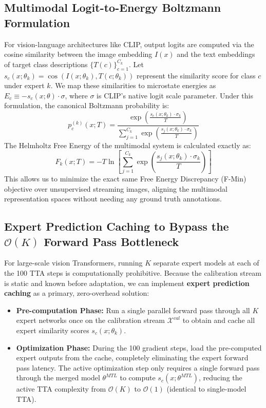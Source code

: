 \documentclass{article}
\theoremstyle{plain}
\theoremstyle{definition}
\theoremstyle{remark}
\begin{document}
\subsection{Multimodal Logit-to-Energy Boltzmann Formulation}
For vision-language architectures like CLIP, output logits are computed via the cosine similarity between the image embedding $I(x)$ and the text embeddings of target class descriptions $\{T(c)\}_{c=1}^{C_k}$. Let $s_c(x; \theta_k) = \cos\left( I(x; \theta_k), T(c; \theta_k) \right)$ represent the similarity score for class $c$ under expert $k$. We map these similarities to microstate energies as $E_c \equiv - s_c(x; \theta) \cdot \sigma$, where $\sigma$ is CLIP's native logit scale parameter. Under this formulation, the canonical Boltzmann probability is:
\begin{equation}
p_c^{(k)}(x; T) = \frac{\exp\left( \frac{s_c(x; \theta_k) \cdot \sigma_k}{T} \right)}{\sum_{j=1}^{C_k} \exp\left( \frac{s_j(x; \theta_k) \cdot \sigma_k}{T} \right)}
\end{equation}
The Helmholtz Free Energy of the multimodal system is calculated exactly as:
\begin{equation}
F_k(x; T) = -T \ln \left[ \sum_{j=1}^{C_k} \exp\left( \frac{s_j(x; \theta_k) \cdot \sigma_k}{T} \right) \right]
\end{equation}
This allows us to minimize the exact same Free Energy Discrepancy (F-Min) objective over unsupervised streaming images, aligning the multimodal representation spaces without needing any ground truth annotations.

\subsection{Expert Prediction Caching to Bypass the $\mathcal{O}(K)$ Forward Pass Bottleneck}
For large-scale vision Transformers, running $K$ separate expert models at each of the 100 TTA steps is computationally prohibitive. Because the calibration stream is static and known before adaptation, we can implement \textbf{expert prediction caching} as a primary, zero-overhead solution:
\begin{itemize}
    \item \textbf{Pre-computation Phase:} Run a single parallel forward pass through all $K$ expert networks once on the calibration stream $\mathcal{X}^{cal}$ to obtain and cache all expert similarity scores $s_c(x; \theta_k)$.
    \item \textbf{Optimization Phase:} During the 100 gradient steps, load the pre-computed expert outputs from the cache, completely eliminating the expert forward pass latency. The active optimization step only requires a single forward pass through the merged model $\theta^{MTL}$ to compute $s_c(x; \theta^{MTL})$, reducing the active TTA complexity from $\mathcal{O}(K)$ to $\mathcal{O}(1)$ (identical to single-model TTA).
\end{itemize}
\end{document}
